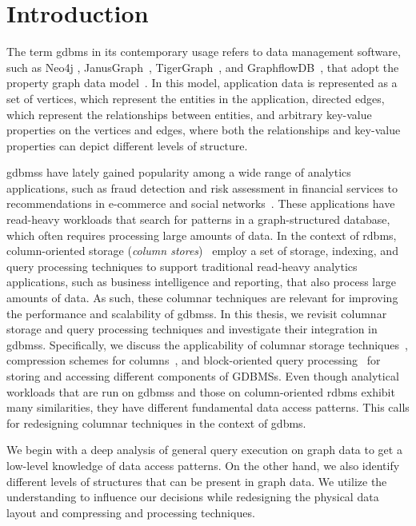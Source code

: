 
\chapter{Introduction}
\label{introduction}

The term \gls{gdbms} in its contemporary usage refers to data management software, such as Neo4j \cite{neo4j}, JanusGraph~\cite{janusgraph}, TigerGraph~\cite{tigergraph}, and GraphflowDB~\cite{kankanamge:graphflow, mhedhbi:sqs}, that adopt the property graph data model~\cite{neo4j-property-graph-model}. In this model, application data is represented as a set of vertices, which represent the entities in the application, directed edges, which represent the relationships between entities, and arbitrary key-value properties on the vertices and edges, where both the relationships and key-value properties can depict different levels of structure.

\gls{gdbms}s have lately gained popularity among a wide range of analytics applications, such as fraud detection and risk assessment in financial services to recommendations in e-commerce and social networks~\cite{sahu:survey}. These applications have read-heavy workloads that search for patterns in a graph-structured database, which often requires processing large amounts of data. In the context of \gls{rdbms}, column-oriented storage ({\em column stores})~\cite{monetdb, oracle-col, c-store, boncz-vectorwise} employ a set of storage, indexing, and query processing techniques to support traditional read-heavy analytics applications, such as business intelligence and reporting, that also process large amounts of data. As such, these columnar techniques are relevant for improving the performance and scalability of \gls{gdbms}s. In this thesis, we revisit columnar storage and query processing techniques and investigate their integration in \gls{gdbms}s. Specifically, we discuss the applicability of columnar storage techniques~\cite{c-store}, compression schemes for columns~\cite{abadi-col-comp, abadi-sparse-col, boncz-comp}, and block-oriented query processing~\cite{boncz-monet-vectorized, col-vs-row} for storing and accessing different components of GDBMSs. Even though analytical workloads that are run on \gls{gdbms}s and those on column-oriented \gls{rdbms} exhibit many similarities, they have different fundamental data access patterns. This calls for redesigning columnar techniques in the context of \gls{gdbms}.

We begin with a deep analysis of general query execution on graph data to get a low-level knowledge of data access patterns. On the other hand, we also identify different levels of structures that can be present in graph data. We utilize the understanding to influence our decisions while redesigning the physical data layout and compressing and processing techniques. 

